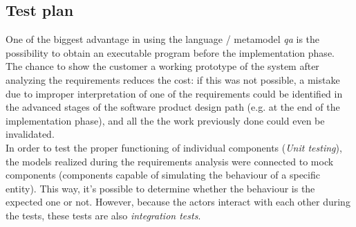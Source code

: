 \subsection{Test plan}
One of the biggest advantage in using the language / metamodel \textit{qa} is the possibility to obtain an executable program before the implementation phase. The chance to show the customer a working prototype of the system after analyzing the requirements reduces the cost: if this was not possible, a mistake due to improper interpretation of one of the requirements could be identified in the advanced stages of the software product design path (e.g. at the end of the implementation phase), and all the the work previously done could even be invalidated.
\\In order to test the proper functioning of individual components (\textit{Unit testing}), the models realized during the requirements analysis were connected to mock components (components capable of simulating the behaviour of a specific entity). This way, it's possible to determine whether the behaviour is the expected one or not. However, because the actors interact with each other during the tests, these tests are also \textit{integration tests}.
